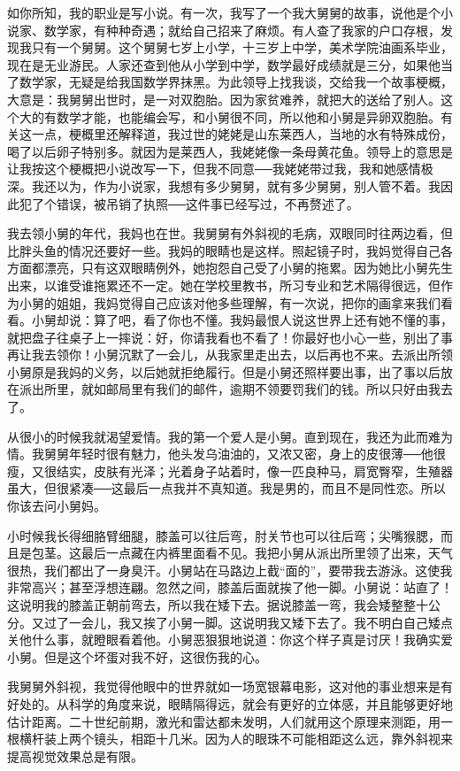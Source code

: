 如你所知，我的职业是写小说。有一次，我写了一个我大舅舅的故事，说他是个小说家、数学家，有种种奇遇；就给自己招来了麻烦。有人查了我家的户口存根，发现我只有一个舅舅。这个舅舅七岁上小学，十三岁上中学，美术学院油画系毕业，现在是无业游民。人家还查到他从小学到中学，数学最好成绩就是三分，如果他当了数学家，无疑是给我国数学界抹黑。为此领导上找我谈，交给我一个故事梗概，大意是：我舅舅出世时，是一对双胞胎。因为家贫难养，就把大的送给了别人。这个大的有数学才能，也能编会写，和小舅很不同，所以他和小舅是异卵双胞胎。有关这一点，梗概里还解释道，我过世的姥姥是山东莱西人，当地的水有特殊成份，喝了以后卵子特别多。就因为是莱西人，我姥姥像一条母黄花鱼。领导上的意思是让我按这个梗概把小说改写一下，但我不同意──我姥姥带过我，我和她感情极深。我还以为，作为小说家，我想有多少舅舅，就有多少舅舅，别人管不着。我因此犯了个错误，被吊销了执照──这件事已经写过，不再赘述了。 

我去领小舅的年代，我妈也在世。我舅舅有外斜视的毛病，双眼同时往两边看，但比胖头鱼的情况还要好一些。我妈的眼睛也是这样。照起镜子时，我妈觉得自己各方面都漂亮，只有这双眼睛例外，她抱怨自己受了小舅的拖累。因为她比小舅先生出来，以谁受谁拖累还不一定。她在学校里教书，所习专业和艺术隔得很远，但作为小舅的姐姐，我妈觉得自己应该对他多些理解，有一次说，把你的画拿来我们看看。小舅却说：算了吧，看了你也不懂。我妈最恨人说这世界上还有她不懂的事，就把盘子往桌子上一摔说：好，你请我看也不看了！你最好也小心一些，别出了事再让我去领你！小舅沉默了一会儿，从我家里走出去，以后再也不来。去派出所领小舅原是我妈的义务，以后她就拒绝履行。但是小舅还照样要出事，出了事以后放在派出所里，就如邮局里有我们的邮件，逾期不领要罚我们的钱。所以只好由我去了。 

从很小的时候我就渴望爱情。我的第一个爱人是小舅。直到现在，我还为此而难为情。我舅舅年轻时很有魅力，他头发乌油油的，又浓又密，身上的皮很薄──他很瘦，又很结实，皮肤有光泽；光着身子站着时，像一匹良种马，肩宽臀窄，生殖器虽大，但很紧凑──这最后一点我并不真知道。我是男的，而且不是同性恋。所以你该去问小舅妈。 

小时候我长得细胳臂细腿，膝盖可以往后弯，肘关节也可以往后弯；尖嘴猴腮，而且是包茎。这最后一点藏在内裤里面看不见。我把小舅从派出所里领了出来，天气很热，我们都出了一身臭汗。小舅站在马路边上截“面的”，要带我去游泳。这使我非常高兴；甚至浮想连翩。忽然之间，膝盖后面就挨了他一脚。小舅说：站直了！这说明我的膝盖正朝前弯去，所以我在矮下去。据说膝盖一弯，我会矮整整十公分。又过了一会儿，我又挨了小舅一脚。这说明我又矮下去了。我不明白自己矮点关他什么事，就瞪眼看着他。小舅恶狠狠地说道：你这个样子真是讨厌！我确实爱小舅。但是这个坏蛋对我不好，这很伤我的心。 

我舅舅外斜视，我觉得他眼中的世界就如一场宽银幕电影，这对他的事业想来是有好处的。从科学的角度来说，眼睛隔得远，就会有更好的立体感，并且能够更好地估计距离。二十世纪前期，激光和雷达都未发明，人们就用这个原理来测距，用一根横杆装上两个镜头，相距十几米。因为人的眼珠不可能相距这么远，靠外斜视来提高视觉效果总是有限。 

